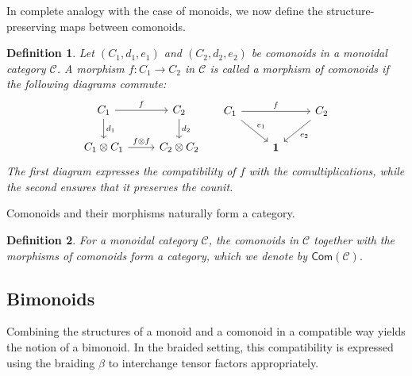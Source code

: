 \documentclass{amsart}
\newtheorem{definition}{Definition}[section]
\begin{document}
In complete analogy with the case of monoids, we now define the structure-preserving maps between comonoids.

\begin{definition}\label{def:comonoid_morphism}
Let $(C_1, d_1, e_1)$ and $(C_2, d_2, e_2)$ be comonoids in a monoidal category $\mathcal{C}$. A morphism $f \colon C_1 \longrightarrow C_2$ in $\mathcal{C}$ is called a morphism of comonoids if the following diagrams commute:
\[
\begin{tikzcd}
C_1\arrow{r}{f}\arrow{d}{d_1} & C_2\arrow{d}{d_2}\\
C_1\otimes C_1\arrow{r}{f\otimes f} & C_2\otimes C_2
\end{tikzcd}
\;\;\;\;\;
\begin{tikzcd}
C_1\arrow{rr}{f}\arrow{dr}{e_1}&&C_2\arrow{dl}{e_2}\\
&\mathbf{1}
\end{tikzcd}
\]
The first diagram expresses the compatibility of $f$ with the comultiplications, while the second ensures that it preserves the counit.
\end{definition}

Comonoids and their morphisms naturally form a category.

\begin{definition}\label{def:com_category}
For a monoidal category $\mathcal{C}$, the comonoids in $\mathcal{C}$ together with the morphisms of comonoids form a category, which we denote by $\mathsf{Com}(\mathcal{C})$.
\end{definition}

\subsection{Bimonoids}

Combining the structures of a monoid and a comonoid in a compatible way yields the notion of a bimonoid. In the braided setting, this compatibility is expressed using the braiding $\beta$ to interchange tensor factors appropriately.
\end{document}
